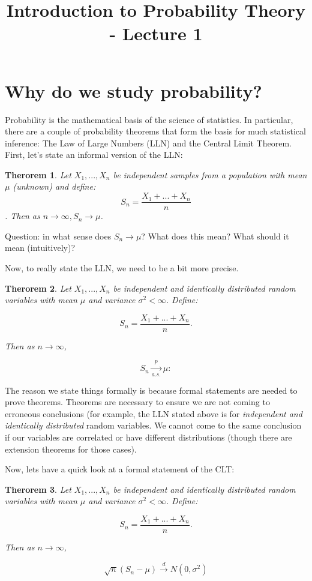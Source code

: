 \documentclass[12pt]{article} %
\title{Introduction to Probability Theory - Lecture 1}
\newtheorem{thm}{Therorem}
\begin{document}
\maketitle
\section{Why do we study probability?}
Probability is the mathematical basis of the science of statistics. In particular, there are a couple of probability theorems that form the basis for much statistical inference: The Law of Large Numbers (LLN) and the Central Limit Theorem.\\

First, let's state an informal version of the LLN:\\

\begin{thm}
Let $X_1,...,X_n$ be independent samples from a population with mean $\mu$ (unknown) and define:
$$S_n = \frac{X_1+...+X_n}n$$.
Then as $n\rightarrow\infty, S_n\rightarrow\mu$.
\end{thm}
Question: in what sense does $S_n\rightarrow\mu$? What does this mean? What should it mean (intuitively)? 

Now, to really state the LLN, we need to be a bit more precise. \\
\begin{thm}
Let $X_1,...,X_n$ be independent and identically distributed random variables with mean $\mu$ and variance $\sigma^2<\infty$. Define:

$$S_n=\frac{X_1+...+X_n}{n}.$$

Then as $n\rightarrow\infty$, 

$$S_n\xrightarrow[a.s.]{p}\mu:$$
\end{thm}
The reason we state things formally is because formal statements are needed to prove theorems. Theorems are necessary to ensure we are not coming to erroneous conclusions (for example, the LLN stated above is for \emph{independent and identically distributed} random variables. We cannot come to the same conclusion if our variables are correlated or have different distributions (though there are extension theorems for those cases).

Now, lets have a quick look at a formal statement of the CLT:

\begin{thm}
Let $X_1,...,X_n$ be independent and identically distributed random variables with mean $\mu$ and variance $\sigma^2<\infty$. Define:

$$S_n=\frac{X_1+...+X_n}{n}.$$

Then as $n\rightarrow\infty$, 

$$\sqrt{n}\left(S_n-\mu\right)\xrightarrow{d} N(0,\sigma^2)$$
\end{thm}
\end{document}
